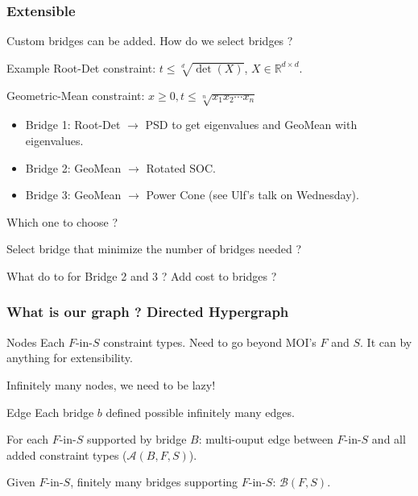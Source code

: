 \documentclass{beamer}
\begin{document}
\begin{frame}
  \frametitle{Extensible}
  \alert{Custom} bridges can be added.
  How do we select bridges ?

  \begin{block}{Example}
    Root-Det constraint: $t \le \sqrt[d]{\det(X)}$, $X \in \mathbb{R}^{d \times d}$.

    Geometric-Mean constraint: $x \ge 0, t \le \sqrt[n]{x_1 x_2 \cdots x_n}$
    \begin{itemize}
      \item Bridge 1: Root-Det $\to$ PSD to get eigenvalues and GeoMean with eigenvalues.
      \item Bridge 2: GeoMean $\to$ Rotated SOC.
      \item Bridge 3: GeoMean $\to$ Power Cone (see Ulf's talk on Wednesday).
    \end{itemize}
  \end{block}
  \vspace{-1em}
  Which one to choose ?

  Select bridge that minimize the \alert{number} of bridges needed ?

  What do to for Bridge 2 and 3 ? Add \alert{cost} to bridges ?
\end{frame}

\begin{frame}
  \frametitle{What is our graph ? Directed Hypergraph}
  \begin{block}{Nodes}
    Each $F$-in-$S$ constraint types.
    Need to go beyond MOI's $F$ and $S$.
    It can by \alert{anything} for \alert{extensibility}.

    \alert{Infinitely} many nodes, we need to be \alert{lazy}!
  \end{block}
  \begin{block}{Edge}
    Each bridge $b$ defined possible \alert{infinitely} many edges.

    For each $F$-in-$S$ supported by bridge $B$:
    \alert{multi}-ouput edge between $F$-in-$S$ and
    all added constraint types ($\mathcal{A}(B, F, S)$).

    Given $F$-in-$S$, \alert{finitely} many bridges supporting $F$-in-$S$: $\mathcal{B}(F, S)$.
  \end{block}
\end{frame}
\end{document}
